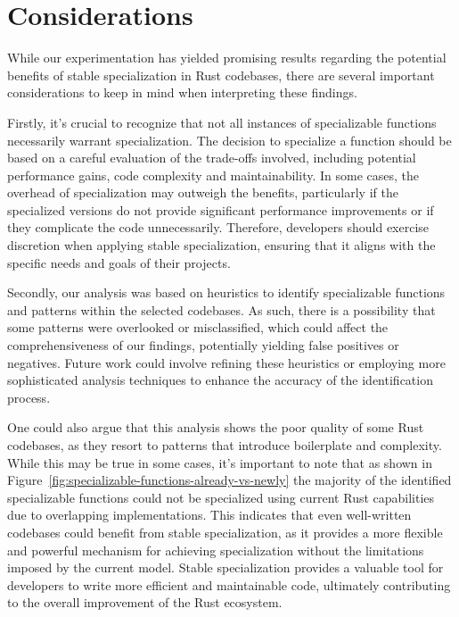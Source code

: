 
\section{Considerations}\label{sec:experimentation-considerations}
While our experimentation has yielded promising results regarding the potential benefits of stable specialization in Rust codebases, there are several important considerations to keep in mind when interpreting these findings.

Firstly, it's crucial to recognize that not all instances of specializable functions necessarily warrant specialization.
The decision to specialize a function should be based on a careful evaluation of the trade-offs involved, including potential performance gains, code complexity and maintainability.
In some cases, the overhead of specialization may outweigh the benefits, particularly if the specialized versions do not provide significant performance improvements or if they complicate the code unnecessarily.
Therefore, developers should exercise discretion when applying stable specialization, ensuring that it aligns with the specific needs and goals of their projects.

Secondly, our analysis was based on heuristics to identify specializable functions and patterns within the selected codebases.
As such, there is a possibility that some patterns were overlooked or misclassified, which could affect the comprehensiveness of our findings, potentially yielding false positives or negatives.
Future work could involve refining these heuristics or employing more sophisticated analysis techniques to enhance the accuracy of the identification process.

One could also argue that this analysis shows the poor quality of some Rust codebases, as they resort to patterns that introduce boilerplate and complexity.
While this may be true in some cases, it's important to note that as shown in Figure~\ref{fig:specializable-functions-already-vs-newly} the majority of the identified specializable functions could not be specialized using current Rust capabilities due to overlapping implementations.
This indicates that even well-written codebases could benefit from stable specialization, as it provides a more flexible and powerful mechanism for achieving specialization without the limitations imposed by the current model.
Stable specialization provides a valuable tool for developers to write more efficient and maintainable code, ultimately contributing to the overall improvement of the Rust ecosystem.

